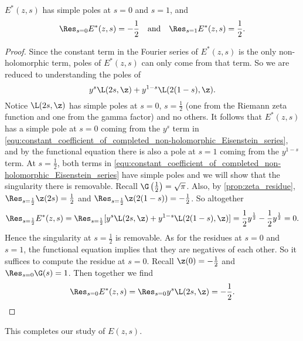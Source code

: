       \begin{proposition}\label{equ:completed_real-analytic_Eisenstein_series_residues}
        $E^{\ast}(z,s)$ has simple poles at $s = 0$ and $s = 1$, and
        \[
          \Res_{s = 0}E^{\ast}(z,s) = -\frac{1}{2} \quad \text{and} \quad \Res_{s = 1}E^{\ast}(z,s) = \frac{1}{2}.
        \]
      \end{proposition}
      \begin{proof}
        Since the constant term in the Fourier series of $E^{\ast}(z,s)$ is the only non-holomorphic term, poles of $E^{\ast}(z,s)$ can only come from that term. So we are reduced to understanding the poles of
        \begin{equation}\label{equ:constant_coefficient_of_completed_non-holomorphic_Eisenstein_series}
          y^{s}\L(2s,\z)+y^{1-s}\L(2(1-s),\z).
        \end{equation}
        Notice $\L(2s,\z)$ has simple poles at $s = 0$, $s = \frac{1}{2}$ (one from the Riemann zeta function and one from the gamma factor) and no others. It follows that $E^{\ast}(z,s)$ has a simple pole at $s = 0$ coming from the $y^{s}$ term in
        \cref{equ:constant_coefficient_of_completed_non-holomorphic_Eisenstein_series}, and by the functional equation there is also a pole at $s = 1$ coming from the $y^{1-s}$ term. At $s = \frac{1}{2}$, both terms in \cref{equ:constant_coefficient_of_completed_non-holomorphic_Eisenstein_series} have simple poles and we will show that the singularity there is removable. Recall $\G\left(\frac{1}{2}\right) = \sqrt{\pi}$. Also, by \cref{prop:zeta_residue}, $\Res_{s = \frac{1}{2}}\z(2s) = \frac{1}{2}$ and $\Res_{s = \frac{1}{2}}\z(2(1-s)) = -\frac{1}{2}$. So altogether
        \[
          \Res_{s = \frac{1}{2}}E^{\ast}(z,s) = \Res_{s = \frac{1}{2}}[y^{s}\L(2s,\z)+y^{1-s}\L(2(1-s),\z)] = \frac{1}{2}y^{\frac{1}{2}}-\frac{1}{2}y^{\frac{1}{2}} = 0.
        \]
        Hence the singularity at $s = \frac{1}{2}$ is removable. As for the residues at $s = 0$ and $s = 1$, the functional equation implies that they are negatives of each other. So it suffices to compute the residue at $s = 0$. Recall $\z(0) = -\frac{1}{2}$ and $\Res_{s = 0}\G(s) = 1$. Then together we find
        \[
          \Res_{s = 0}E^{\ast}(z,s) = \Res_{s = 0}y^{s}\L(2s,\z) = -\frac{1}{2}.
        \]
      \end{proof}

      This completes our study of $E(z,s)$.
